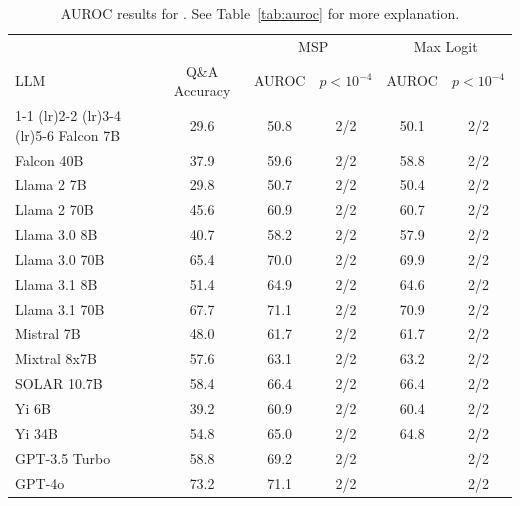 \begin{table}[h]
\caption{AUROC results for . See Table~\ref{tab:auroc} for more explanation.}
\label{tab:auroc_margin}
\centering
\begin{tabular}{lccccc}
\toprule
& & \multicolumn{2}{c}{MSP} & \multicolumn{2}{c}{Max Logit} \\ 
LLM & Q\&A Accuracy & AUROC & $p < 10^{-4}$ & AUROC & $p < 10^{-4}$ \\ 
\cmidrule(lr){1-1} \cmidrule(lr){2-2} \cmidrule(lr){3-4} \cmidrule(lr){5-6} 
Falcon 7B & 29.6 & 50.8 & 2/2 & 50.1 & 2/2\\
Falcon 40B & 37.9 & 59.6 & 2/2 & 58.8 & 2/2\\
Llama 2 7B & 29.8 & 50.7 & 2/2 & 50.4 & 2/2\\
Llama 2 70B & 45.6 & 60.9 & 2/2 & 60.7 & 2/2\\
Llama 3.0 8B & 40.7 & 58.2 & 2/2 & 57.9 & 2/2\\
Llama 3.0 70B & 65.4 & 70.0 & 2/2 & 69.9 & 2/2\\
Llama 3.1 8B & 51.4 & 64.9 & 2/2 & 64.6 & 2/2\\
Llama 3.1 70B & 67.7 & 71.1 & 2/2 & 70.9 & 2/2\\
Mistral 7B & 48.0 & 61.7 & 2/2 & 61.7 & 2/2\\
Mixtral 8x7B & 57.6 & 63.1 & 2/2 & 63.2 & 2/2\\
SOLAR 10.7B & 58.4 & 66.4 & 2/2 & 66.4 & 2/2\\
Yi 6B & 39.2 & 60.9 & 2/2 & 60.4 & 2/2\\
Yi 34B & 54.8 & 65.0 & 2/2 & 64.8 & 2/2\\
GPT-3.5 Turbo & 58.8 & 69.2 & 2/2 &  & 2/2\\
GPT-4o & 73.2 & 71.1 & 2/2 &  & 2/2\\
\bottomrule
\end{tabular}
\end{table}
